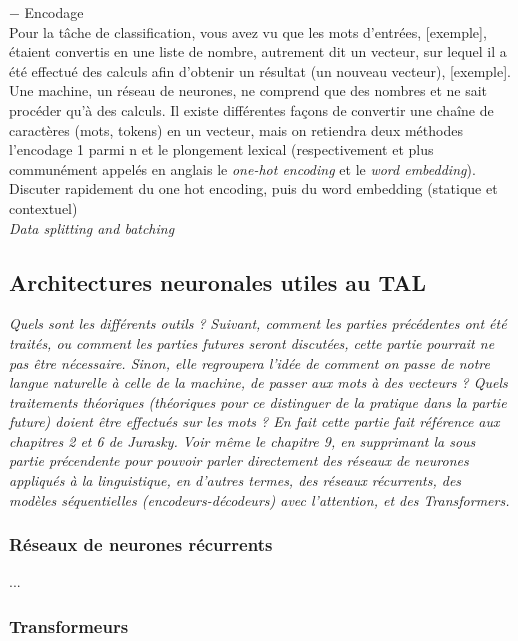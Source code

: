 \documentclass[12pt, french]{report}
\begin{document}
$-$ Encodage\\
    Pour la tâche de classification, vous avez vu que les mots d'entrées, [exemple], étaient convertis en une liste de nombre, autrement dit un vecteur, sur lequel il a été effectué des calculs afin d'obtenir un résultat (un nouveau vecteur), [exemple]. Une machine, un réseau de neurones, ne comprend que des nombres et ne sait procéder qu'à des calculs. Il existe différentes façons de convertir une chaîne de caractères (mots, tokens) en un vecteur, mais on retiendra deux méthodes l'encodage 1 parmi n et le plongement lexical (respectivement et plus communément appelés en anglais le \textit{one-hot encoding} et le \textit{word embedding}).\\

    Discuter rapidement du one hot encoding, puis du word embedding (statique et contextuel)\\
    
    \textit{Data splitting and batching}


\subsection{Architectures neuronales utiles au TAL}
\textit{Quels sont les différents outils ?}
\textit{Suivant, comment les parties précédentes ont été traités, ou comment les parties futures seront discutées, cette partie pourrait ne pas être nécessaire. Sinon, elle regroupera l'idée de comment on passe de notre langue naturelle à celle de la machine, de passer aux mots à des vecteurs ? Quels traitements théoriques (théoriques pour ce distinguer de la pratique dans la partie future) doient être effectués sur les mots ? En fait cette partie fait référence aux chapitres 2 et 6 de Jurasky. Voir même le chapitre 9, en supprimant la sous partie précendente pour pouvoir parler directement des réseaux de neurones appliqués à la linguistique, en d'autres termes, des réseaux récurrents, des modèles séquentielles (encodeurs-décodeurs) avec l'attention, et des Transformers.}\\

\subsubsection{Réseaux de neurones récurrents}

...

\subsubsection{Transformeurs}
\end{document}
